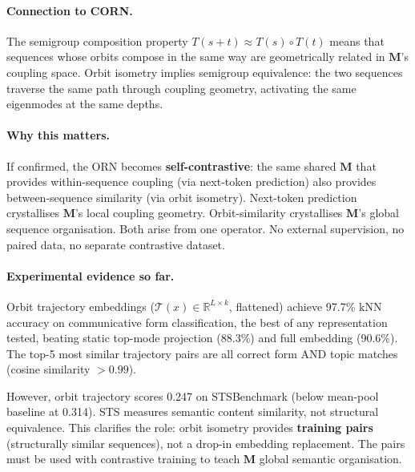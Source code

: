 \documentclass[11pt, a4paper]{article}
\newcommand{\M}{\mathbf{M}}
\newcommand{\R}{\mathbb{R}}
\theoremstyle{plain}
\theoremstyle{remark}
\begin{document}
\paragraph{Connection to CORN.}
The semigroup composition property $T(s{+}t) \approx T(s) \circ T(t)$ means that sequences whose orbits compose in the same way are geometrically related in $\M$'s coupling space.
Orbit isometry implies semigroup equivalence: the two sequences traverse the same path through coupling geometry, activating the same eigenmodes at the same depths.

\paragraph{Why this matters.}
If confirmed, the ORN becomes \textbf{self-contrastive}: the same shared $\M$ that provides within-sequence coupling (via next-token prediction) also provides between-sequence similarity (via orbit isometry).
Next-token prediction crystallises $\M$'s local coupling geometry.
Orbit-similarity crystallises $\M$'s global sequence organisation.
Both arise from one operator.
No external supervision, no paired data, no separate contrastive dataset.

\paragraph{Experimental evidence so far.}
Orbit trajectory embeddings ($\mathcal{T}(x) \in \R^{L \times k}$, flattened) achieve 97.7\% kNN accuracy on communicative form classification, the best of any representation tested, beating static top-mode projection (88.3\%) and full embedding (90.6\%).
The top-5 most similar trajectory pairs are all correct form AND topic matches (cosine similarity ${>}0.99$).

However, orbit trajectory scores 0.247 on STSBenchmark (below mean-pool baseline at 0.314).
STS measures semantic content similarity, not structural equivalence.
This clarifies the role: orbit isometry provides \textbf{training pairs} (structurally similar sequences), not a drop-in embedding replacement.
The pairs must be used with contrastive training to teach $\M$ global semantic organisation.
\end{document}
